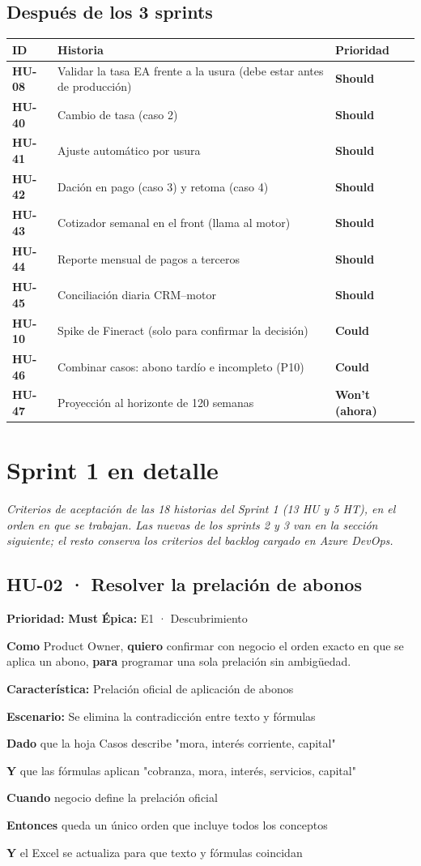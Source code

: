 \documentclass[11pt,a4paper]{article}
\newcommand{\kw}[1]{\textbf{\color{primario}#1}}
\newcommand{\nv}[1]{\par\hspace*{#1em}}
\newcommand{\hu}[5]{%
  \subsection*{#1 · #2}
  \noindent\textbf{Prioridad:} #3 \quad\textbf{Épica:} #4\par\smallskip
  \noindent #5\par\smallskip}
\newcommand{\como}[3]{\textbf{Como} #1, \textbf{quiero} #2, \textbf{para} #3.}
\newcommand{\must}{\colorbox{alerta}{\color{white}\textbf{\small Must}}}
\newcommand{\should}{\colorbox{primario}{\color{white}\textbf{\small Should}}}
\newcommand{\could}{\colorbox{gris}{\color{white}\textbf{\small Could}}}
\newcommand{\wont}{\colorbox{gray!40}{\textbf{\small Won't (ahora)}}}
\begin{document}
\subsection{Después de los 3 sprints}
\begin{longtable}{>{\bfseries}p{1.2cm} p{10.2cm} p{1.5cm}}
\toprule
ID & Historia & Prioridad \\
\midrule
\endhead
HU-08 & Validar la tasa EA frente a la usura (debe estar antes de producción) & \should \\
HU-40 & Cambio de tasa (caso 2) & \should \\
HU-41 & Ajuste automático por usura & \should \\
HU-42 & Dación en pago (caso 3) y retoma (caso 4) & \should \\
HU-43 & Cotizador semanal en el front (llama al motor) & \should \\
HU-44 & Reporte mensual de pagos a terceros & \should \\
HU-45 & Conciliación diaria CRM–motor & \should \\
HU-10 & Spike de Fineract (solo para confirmar la decisión) & \could \\
HU-46 & Combinar casos: abono tardío e incompleto (P10) & \could \\
HU-47 & Proyección al horizonte de 120 semanas & \wont \\
\bottomrule
\end{longtable}

\section{Sprint 1 en detalle}

\textit{Criterios de aceptación de las 18 historias del Sprint 1 (13 HU y 5 HT), en el orden en que
se trabajan. Las nuevas de los sprints 2 y 3 van en la sección siguiente; el resto conserva los
criterios del backlog cargado en Azure DevOps.}

\hu{HU-02}{Resolver la prelación de abonos}{\must}{E1 · Descubrimiento}{%
\como{Product Owner}{confirmar con negocio el orden exacto en que se aplica un abono}{programar una sola prelación sin ambigüedad}}
\begin{gherkin}
\kw{Característica:} Prelación oficial de aplicación de abonos
\nv{1}\kw{Escenario:} Se elimina la contradicción entre texto y fórmulas
\nv{2}\kw{Dado} que la hoja Casos describe "mora, interés corriente, capital"
\nv{2}\kw{Y} que las fórmulas aplican "cobranza, mora, interés, servicios, capital"
\nv{2}\kw{Cuando} negocio define la prelación oficial
\nv{2}\kw{Entonces} queda un único orden que incluye todos los conceptos
\nv{2}\kw{Y} el Excel se actualiza para que texto y fórmulas coincidan
\end{gherkin}
\end{document}
